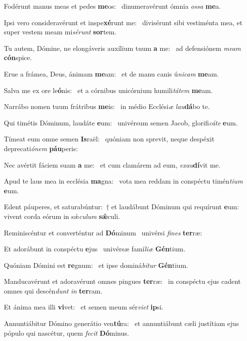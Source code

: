 \item Fodérunt manus meas et pedes \textbf{me}os:~\psstar{} dinumeravérunt ómnia \textit{ossa} \textbf{me}a.
\item Ipsi vero consideravérunt et inspe\textbf{xé}runt me:~\psstar{} divisérunt sibi vestiménta mea, et super vestem meam mi\textit{sérunt} \textbf{sor}tem.
\item Tu autem, Dómine, ne elongáveris auxílium tuum \textbf{a} me:~\psstar{} ad defensiónem \textit{meam} \textbf{cón}spice.
\item Erue a frámea, Deus, ánimam \textbf{me}am:~\psstar{} et de manu canis ú\textit{nicam} \textbf{me}am.
\item Salva me ex ore le\textbf{ó}nis:~\psstar{} et a córnibus unicórnium humili\textit{tátem} \textbf{me}am.
\item Narrábo nomen tuum frátribus \textbf{me}is:~\psstar{} in médio Ecclési\textit{æ} \textit{lau}\textbf{dá}bo te.
\item Qui timétis Dóminum, laudáte \textbf{e}um:~\psstar{} univérsum semen Jacob, glorifi\textit{cáte} \textbf{e}um.
\item Tímeat eum omne semen \textbf{Is}raël:~\psstar{} quóniam non sprevit, neque despéxit deprecati\textit{ónem} \textbf{páu}peris:
\item Nec avértit fáciem suam \textbf{a} me:~\psstar{} et cum clamárem ad eum, \textit{exau}\textbf{dí}vit me.
\item Apud te laus mea in ecclésia \textbf{ma}gna:~\psstar{} vota mea reddam in conspéctu timén\textit{tium} \textbf{e}um.
\item Edent páuperes, et saturabúntur:~† et laudábunt Dóminum qui requírunt \textbf{e}um:~\psstar{} vivent corda eórum in sǽ\textit{culum} \textbf{sǽ}culi.
\item Reminiscéntur et converténtur ad \textbf{Dó}minum~\psstar{} univérsi \textit{fines} \textbf{ter}ræ:
\item Et adorábunt in conspéctu \textbf{e}jus~\psstar{} univérsæ famí\textit{liæ} \textbf{Gén}tium.
\item Quóniam Dómini est \textbf{re}gnum:~\psstar{} et ipse dominá\textit{bitur} \textbf{Gén}tium.
\item Manducavérunt et adoravérunt omnes pingues \textbf{ter}ræ:~\psstar{} in conspéctu ejus cadent omnes qui descén\textit{dunt} \textit{in} \textbf{ter}ram.
\item Et ánima mea illi \textbf{vi}vet:~\psstar{} et semen meum sér\textit{viet} \textbf{ip}si.
\item Annuntiábitur Dómino generátio ven\textbf{tú}ra:~\psstar{} et annuntiábunt cæli justítiam ejus pópulo qui nascétur, quem \textit{fecit} \textbf{Dó}minus.
